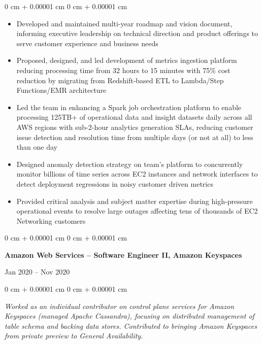 \documentclass[10pt, letterpaper]{article}
\newenvironment{highlights}{
    \begin{itemize}[
        topsep=0.10 cm,
        parsep=0.10 cm,
        partopsep=0pt,
        itemsep=0pt,
        leftmargin=0 cm + 10pt
    ]
}{
    \end{itemize}
} %
\newenvironment{onecolentry}{
    \begin{adjustwidth}{
        0 cm + 0.00001 cm
    }{
        0 cm + 0.00001 cm
    }
}{
    \end{adjustwidth}
} %
\newenvironment{twocolentry}[2][]{
    \onecolentry
    \def\secondColumn{#2}
    \setcolumnwidth{\fill, 4.5 cm}
    \begin{paracol}{2}
}{
    \switchcolumn \raggedleft \secondColumn
    \end{paracol}
    \endonecolentry
} %
\begin{document}
        \vspace{0.05 cm}
        \begin{onecolentry}
            \begin{highlights}
                \item Developed and maintained multi-year roadmap and vision document, informing executive leadership on technical direction and product offerings to serve customer experience and business needs
                \item Proposed, designed, and led development of metrics ingestion platform reducing processing time from 32 hours to 15 minutes with 75\% cost reduction by migrating from Redshift-based ETL to Lambda/Step Functions/EMR architecture
                \item Led the team in enhancing a Spark job orchestration platform to enable processing 125TB+ of operational data and insight datasets daily across all AWS regions with sub-2-hour analytics generation SLAs, reducing customer issue detection and resolution time from multiple days (or not at all) to less than one day
                \item Designed anomaly detection strategy on team's platform to concurrently monitor billions of time series across EC2 instances and network interfaces to detect deployment regressions in noisy customer driven metrics
                \item Provided critical analysis and subject matter expertise during high-pressure operational events to resolve large outages affecting tens of thousands of EC2 Networking customers
            \end{highlights}
        \end{onecolentry}

        \vspace{0.2 cm}

        \begin{twocolentry}{
            Jan 2020 – Nov 2020
        }
            \textbf{Amazon Web Services – Software Engineer II, Amazon Keyspaces}
        \end{twocolentry}

        \vspace{0.05 cm}
        \begin{onecolentry}
            \textit{Worked as an individual contributor on control plane services for Amazon Keyspaces (managed Apache Cassandra), focusing on distributed management of table schema and backing data stores. Contributed to bringing Amazon Keyspaces from private preview to General Availability.}
        \end{onecolentry}
\end{document}
